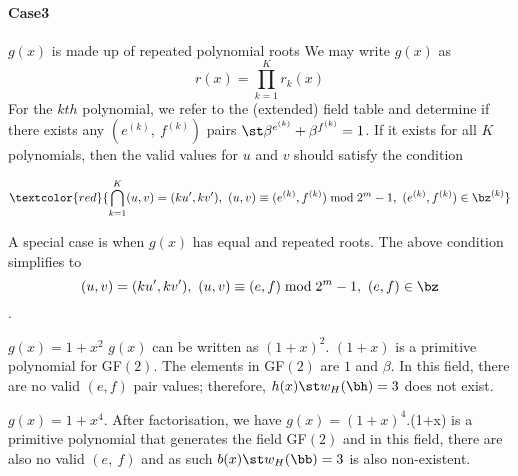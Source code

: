 \paragraph{Case3}$g(x)$ is made up of repeated polynomial roots\newline
We may write $g(x)$ as $$r(x)=\prod_{k=1}^{K}r_k(x)$$ 
For the $kth$ polynomial, we refer to the (extended) field table and determine if there exists any $(e^{(k)},~f^{(k)})$ pairs $\st \beta^{e^{(k)}}+\beta^{f^{(k)}}=1$. If it exists for all $K$ polynomials, then the valid values for $u$ and $v$
 should satisfy the condition

 $$\textcolor{red}{\bigcap_{k=1}^{K} (u,v)=(ku',kv'),~(u,v) \equiv (e^{(k)},f^{(k)})\bmod 2^{m}-1,~(e^{(k)}, f^{(k)}) \in \bz^{(k)}} $$
 
A special case is when $g(x)$ has equal and repeated roots. The above condition simplifies to 
 $$(u,v)=(ku',kv'),~(u,v) \equiv (e,f)\bmod 2^{m}-1,~(e, f) \in \bz $$.
 
 \begin{example}
 $g(x)=1+x^2$ \newline $g(x)$ can be written as $(1+x)^2$. $(1+x)$ is a primitive polynomial for GF$(2)$. The elements in GF$(2)$ are $1$ and $\beta$. In this field,  there are no valid $(e,f)$ pair values; therefore, $h(x) \st w_H(\bh)=3$ does not exist.
 \end{example}
 
  \begin{example}
 $g(x) = 1+x^4$.\newline
 After factorisation, we have $g(x)=(1+x)^4. $(1+x) is a primitive polynomial that generates the field GF$(2)$ and in this field, there are also no valid $(e,~f)$ and as such $b(x) \st w_H(\bb)=3$ is also non-existent.
 \end{example}
 
